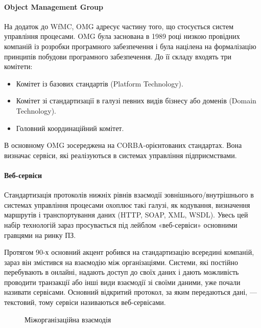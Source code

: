 \documentclass{memoir}
\begin{document}
\paragraph{Object Management Group}

На додаток до WfMC, OMG адресує частину того, що стосується систем управління процесами. OMG була заснована в 1989 році низкою провідних компаній із розробки програмного забезпечення і була націлена на формалізацію принципів побудови програмного забезпечення. До її складу входять три комітети:

\begin{itemize}
    \item Комітет із базових стандартів (Platform Technology).
    \item Комітет зі стандартизації в галузі певних видів бізнесу або доменів (Domain Technology).
    \item Головний координаційний комітет.
\end{itemize}

В основному OMG зосереджена на CORBA-орієнтованих стандартах. Вона визначає сервіси, які реалізуються в системах управління підприємствами.

\paragraph{Веб-сервіси}

Стандартизація протоколів нижніх рівнів взаємодії зовнішнього/внутрішнього в системах управління процесами охоплює такі галузі, як кодування, визначення маршрутів і транспортування даних (HTTP, SOAP, XML, WSDL). Увесь цей набір технологій зараз просувається під лейблом «веб-сервіси» основними гравцями на ринку ПЗ.

Протягом 90-х основний акцент робився на стандартизацію всередині компаній, зараз він змістився на взаємодію між організаціями. Системи, які постійно перебувають в онлайні, надають доступ до своїх даних і дають можливість проводити транзакції або інші види взаємодії зі своїми даними, уже почали називати сервісами. Основний відкритий протокол, за яким передаються дані, — текстовий, тому сервіси називаються веб-сервісами.

\begin{figure}[h]
    \centering
    \caption{Міжорганізаційна взаємодія}
    \label{fig:inter_org}
\end{figure}
\end{document}

